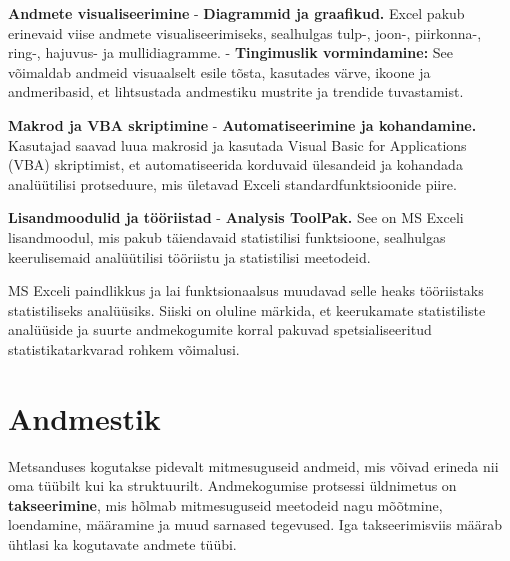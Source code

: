 \documentclass[
]{book}
\theoremstyle{definition}
\theoremstyle{definition}
\theoremstyle{definition}
\theoremstyle{definition}
\theoremstyle{remark}
\begin{document}
\textbf{Andmete visualiseerimine}
- \textbf{Diagrammid ja graafikud.} Excel pakub erinevaid viise andmete visualiseerimiseks, sealhulgas tulp-, joon-, piirkonna-, ring-, hajuvus- ja mullidiagramme.
- \textbf{Tingimuslik vormindamine:} See võimaldab andmeid visuaalselt esile tõsta, kasutades värve, ikoone ja andmeribasid, et lihtsustada andmestiku mustrite ja trendide tuvastamist.

\textbf{Makrod ja VBA skriptimine}
- \textbf{Automatiseerimine ja kohandamine.} Kasutajad saavad luua makrosid ja kasutada Visual Basic for Applications (VBA) skriptimist, et automatiseerida korduvaid ülesandeid ja kohandada analüütilisi protseduure, mis ületavad Exceli standardfunktsioonide piire.

\textbf{Lisandmoodulid ja tööriistad}
- \textbf{Analysis ToolPak.} See on MS Exceli lisandmoodul, mis pakub täiendavaid statistilisi funktsioone, sealhulgas keerulisemaid analüütilisi tööriistu ja statistilisi meetodeid.

MS Exceli paindlikkus ja lai funktsionaalsus muudavad selle heaks tööriistaks statistiliseks analüüsiks. Siiski on oluline märkida, et keerukamate statistiliste analüüside ja suurte andmekogumite korral pakuvad spetsialiseeritud statistikatarkvarad rohkem võimalusi.

\chapter{Andmestik}\label{andmestik}

Metsanduses kogutakse pidevalt mitmesuguseid andmeid, mis võivad erineda nii oma tüübilt kui ka struktuurilt. Andmekogumise protsessi üldnimetus on \textbf{takseerimine}, mis hõlmab mitmesuguseid meetodeid nagu mõõtmine, loendamine, määramine ja muud sarnased tegevused. Iga takseerimisviis määrab ühtlasi ka kogutavate andmete tüübi.
\end{document}
